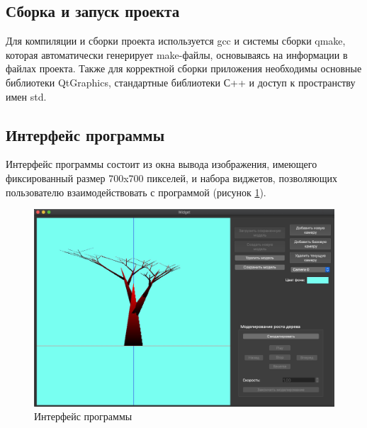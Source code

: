 \documentclass[54pt, a4paper]{article}
\begin{document}
	\subsection {Сборка и запуск проекта}
	Для компиляции и сборки проекта используется gcc и системы сборки
	qmake\cite{Qt}, которая автоматически генерирует make-файлы, основываясь на информации в файлах проекта. Также для корректной сборки приложения необходимы основные библиотеки QtGraphics, стандартные библиотеки С++ и доступ к пространству имен std.
	\newpage
	\subsection{Интерфейс программы}
	
	Интерфейс программы состоит из окна вывода изображения, имеющего фиксированный размер 700x700 пикселей, и набора виджетов, позволяющих пользователю взаимодействовать с программой (рисунок \ref{ris:prog}).
	\begin{figure}[h!]
		\centering
		\includegraphics[scale=0.2]{img/tree.JPG}
		\caption{Интерфейс программы}
		\label{ris:prog}
	\end{figure}
	
\end{document}
